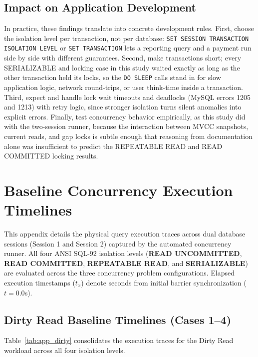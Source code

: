\documentclass[sigconf, pbalance, nonacm]{acmart}
\begin{document}
\subsection{Impact on Application Development}
In practice, these findings translate into concrete development rules. First, choose the isolation level per transaction, not per database: \texttt{SET SESSION TRANSACTION ISOLATION LEVEL} or \texttt{SET TRANSACTION} lets a reporting query and a payment run side by side with different guarantees. Second, make transactions short; every SERIALIZABLE and locking case in this study waited exactly as long as the other transaction held its locks, so the \texttt{DO SLEEP} calls stand in for slow application logic, network round-trips, or user think-time inside a transaction. Third, expect and handle lock wait timeouts and deadlocks (MySQL errors 1205 and 1213) with retry logic, since stronger isolation turns silent anomalies into explicit errors. Finally, test concurrency behavior empirically, as this study did with the two-session runner, because the interaction between MVCC snapshots, current reads, and gap locks is subtle enough that reasoning from documentation alone was insufficient to predict the REPEATABLE READ and READ COMMITTED locking results.

\appendix
\section{Baseline Concurrency Execution Timelines}
This appendix details the physical query execution traces across dual database sessions (Session 1 and Session 2) captured by the automated concurrency runner. All four ANSI SQL-92 isolation levels (\textbf{READ UNCOMMITTED}, \textbf{READ COMMITTED}, \textbf{REPEATABLE READ}, and \textbf{SERIALIZABLE}) are evaluated across the three concurrency problem configurations. Elapsed execution timestamps ($t_x$) denote seconds from initial barrier synchronization ($t=0.0$s).

\subsection{Dirty Read Baseline Timelines (Cases 1--4)}
Table~\ref{tab:app_dirty} consolidates the execution traces for the Dirty Read workload across all four isolation levels.
\end{document}
